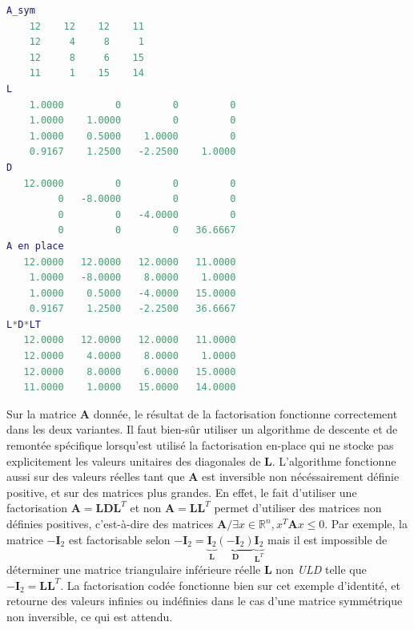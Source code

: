 \documentclass[12pt]{report}
\begin{document}
\begin{lstlisting}[language=Matlab, caption=Résultat des algorithmes de factorisation LDLT]
A_sym
    12    12    12    11
    12     4     8     1
    12     8     6    15
    11     1    15    14
L
    1.0000         0         0         0
    1.0000    1.0000         0         0
    1.0000    0.5000    1.0000         0
    0.9167    1.2500   -2.2500    1.0000
D
   12.0000         0         0         0
         0   -8.0000         0         0
         0         0   -4.0000         0
         0         0         0   36.6667
A en place
   12.0000   12.0000   12.0000   11.0000
    1.0000   -8.0000    8.0000    1.0000
    1.0000    0.5000   -4.0000   15.0000
    0.9167    1.2500   -2.2500   36.6667
L*D*LT
   12.0000   12.0000   12.0000   11.0000
   12.0000    4.0000    8.0000    1.0000
   12.0000    8.0000    6.0000   15.0000
   11.0000    1.0000   15.0000   14.0000
\end{lstlisting}
Sur la matrice $\mathbf{A}$ donnée, le résultat de la factorisation  fonctionne correctement dans les deux variantes. Il faut bien-sûr utiliser un algorithme de descente et de remontée spécifique lorsqu'est utilisé la factorisation en-place qui ne stocke pas explicitement les valeurs unitaires des diagonales de $\mathbf{L}$. L'algorithme fonctionne aussi sur des valeurs réelles tant que $\mathbf{A}$ est inversible non nécéssairement définie positive, et  sur des matrices plus grandes. 
En effet, le fait d'utiliser une factorisation $\mathbf{A} = \mathbf{LDL}^T$ et non  $\mathbf{A} = \mathbf{LL}^T$ permet d'utiliser des matrices non définies positives, c'est-à-dire des matrices $\mathbf{A} / \exists x \in \mathbb{R}^n, x^T\mathbf{A}x \le 0$. Par exemple, la matrice $-\mathbf{I}_2$ est factorisable selon $-\mathbf{I}_2 =\underbrace{ \mathbf{I}_2}_{\mathbf{L}} \underbrace{\left(- \mathbf{I}_2\right)}_{\mathbf{D}} \underbrace{\mathbf{I}_2}_{\mathbf{L}^T} $ mais il est impossible de déterminer une matrice triangulaire inférieure réelle $\mathbf{L}$ non \textit{ULD} telle que $-\mathbf{I}_2 = \mathbf{L} \mathbf{L}^T$. La factorisation codée fonctionne bien sur cet exemple d'identité, et retourne des valeurs infinies ou indéfinies dans le cas d'une matrice symmétrique non inversible, ce qui est attendu.
 
\end{document}
